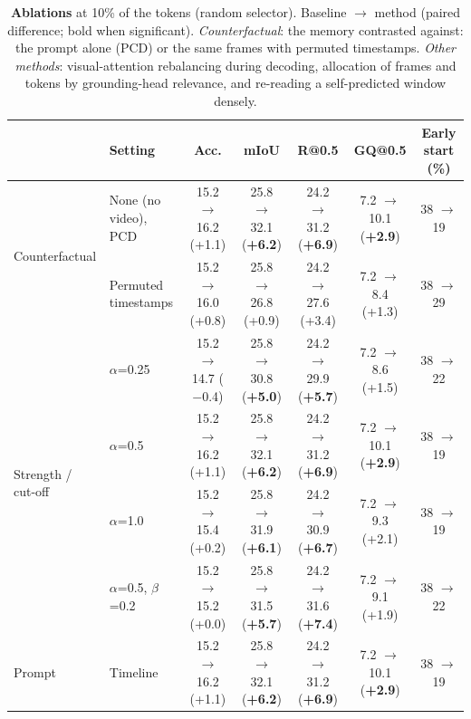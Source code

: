 \begin{table}[t]
\centering
\small
\setlength{\tabcolsep}{4pt}
\caption{\textbf{Ablations} at 10\% of the tokens (random selector). Baseline $\rightarrow$ method (paired difference; bold when significant). \emph{Counterfactual}: the memory contrasted against: the prompt alone (PCD) or the same frames with permuted timestamps. \emph{Other methods}: visual-attention rebalancing during decoding, allocation of frames and tokens by grounding-head relevance, and re-reading a self-predicted window densely.}
\label{tab:pcd-ablation}
\begin{tabular}{llccccc}
\toprule
& Setting & Acc. & mIoU & R@0.5 & GQ@0.5 & Early start (\%) \\
\midrule
\multirow{2}{*}{Counterfactual} & None (no video), PCD & 15.2 $\rightarrow$ 16.2 (+1.1) & 25.8 $\rightarrow$ 32.1 (\textbf{+6.2}) & 24.2 $\rightarrow$ 31.2 (\textbf{+6.9}) & 7.2 $\rightarrow$ 10.1 (\textbf{+2.9}) & 38 $\rightarrow$ 19 \\
 & Permuted timestamps & 15.2 $\rightarrow$ 16.0 (+0.8) & 25.8 $\rightarrow$ 26.8 (+0.9) & 24.2 $\rightarrow$ 27.6 (+3.4) & 7.2 $\rightarrow$ 8.4 (+1.3) & 38 $\rightarrow$ 29 \\
\midrule
\multirow{4}{*}{Strength / cut-off} & $\alpha$=0.25 & 15.2 $\rightarrow$ 14.7 ($-$0.4) & 25.8 $\rightarrow$ 30.8 (\textbf{+5.0}) & 24.2 $\rightarrow$ 29.9 (\textbf{+5.7}) & 7.2 $\rightarrow$ 8.6 (+1.5) & 38 $\rightarrow$ 22 \\
 & $\alpha$=0.5 & 15.2 $\rightarrow$ 16.2 (+1.1) & 25.8 $\rightarrow$ 32.1 (\textbf{+6.2}) & 24.2 $\rightarrow$ 31.2 (\textbf{+6.9}) & 7.2 $\rightarrow$ 10.1 (\textbf{+2.9}) & 38 $\rightarrow$ 19 \\
 & $\alpha$=1.0 & 15.2 $\rightarrow$ 15.4 (+0.2) & 25.8 $\rightarrow$ 31.9 (\textbf{+6.1}) & 24.2 $\rightarrow$ 30.9 (\textbf{+6.7}) & 7.2 $\rightarrow$ 9.3 (+2.1) & 38 $\rightarrow$ 19 \\
 & $\alpha$=0.5, $\beta$=0.2 & 15.2 $\rightarrow$ 15.2 (+0.0) & 25.8 $\rightarrow$ 31.5 (\textbf{+5.7}) & 24.2 $\rightarrow$ 31.6 (\textbf{+7.4}) & 7.2 $\rightarrow$ 9.1 (+1.9) & 38 $\rightarrow$ 22 \\
\midrule
\multirow{2}{*}{Prompt} & Timeline & 15.2 $\rightarrow$ 16.2 (+1.1) & 25.8 $\rightarrow$ 32.1 (\textbf{+6.2}) & 24.2 $\rightarrow$ 31.2 (\textbf{+6.9}) & 7.2 $\rightarrow$ 10.1 (\textbf{+2.9}) & 38 $\rightarrow$ 19 \\

\end{tabular}
\end{table}
